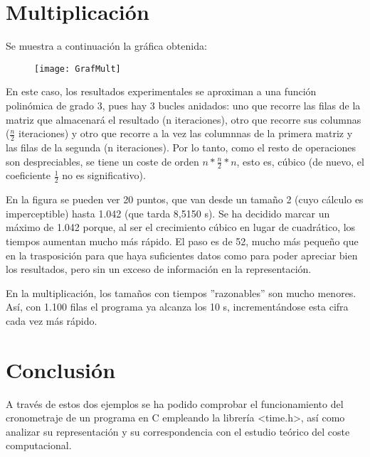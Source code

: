 \documentclass[a4paper,12pt]{article}
\begin{document}
\section*{Multiplicación}
Se muestra a continuación la gráfica obtenida:\par
\begin{figure}[h]
	\centering
	\texttt{[image: GrafMult]}
\end{figure}
En este caso, los resultados experimentales se aproximan a una función polinómica de grado 3, pues hay 3 bucles anidados: uno que recorre las filas de la matriz que almacenará el resultado (n iteraciones), otro que recorre sus columnas ($\frac{n}{2}$ iteraciones) y otro que recorre a la vez las columnnas de la primera matriz y las filas de la segunda (n iteraciones). Por lo tanto, como el resto de operaciones son despreciables, se tiene un coste de orden $n*\frac{n}{2}*n$, esto es, cúbico (de nuevo, el coeficiente $\frac{1}{2}$ no es significativo).\par
En la figura se pueden ver 20 puntos, que van desde un tamaño 2 (cuyo cálculo es imperceptible) hasta 1.042 (que tarda 8,5150 s). Se ha decidido marcar un máximo de 1.042 porque, al ser el crecimiento cúbico en lugar de cuadrático, los tiempos aumentan mucho más rápido. El paso es de 52, mucho más pequeño que en la trasposición para que haya suficientes datos como para poder apreciar bien los resultados, pero sin un exceso de información en la representación.\par
En la multiplicación, los tamaños con tiempos ''razonables'' son mucho menores. Así, con 1.100 filas el programa ya alcanza los 10 s, incrementándose esta cifra cada vez más rápido.

\section*{Conclusión}
A través de estos dos ejemplos se ha podido comprobar el funcionamiento del cronometraje de un programa en C empleando la librería <time.h>, así como analizar su representación y su correspondencia con el estudio teórico del coste computacional.
\end{document}
